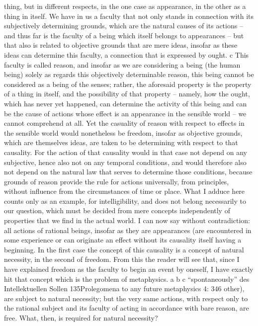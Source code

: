 thing, but in different respects, in the one case as appearance, in the
other as a thing in itself.
We have in us a faculty that not only stands in connection with its
subjectively determining grounds, which are the natural causes of its
actions – and thus far is the faculty of a being which itself belongs to
appearances – but that also is related to objective grounds that are mere
ideas, insofar as these ideas can determine this faculty, a connection that
is expressed by ought. c This faculty is called reason, and insofar as we are
considering a being (the human being) solely as regards this objectively
determinable reason, this being cannot be considered as a being of the
senses; rather, the aforesaid property is the property of a thing in itself,
and the possibility of that property – namely, how the ought, which has
never yet happened, can determine the activity of this being and can be
the cause of actions whose effect is an appearance in the sensible world –
we cannot comprehend at all. Yet the casuality of reason with respect to
effects in the sensible world would nonetheless be freedom, insofar as
objective grounds, which are themselves ideas, are taken to be determining
with respect to that causality. For the action of that causality would in
that case not depend on any subjective, hence also not on any temporal
conditions, and would therefore also not depend on the natural law that
serves to determine those conditions, because grounds of reason provide
the rule for actions universally, from principles, without inﬂuence from
the circumstances of time or place.
What I adduce here counts only as an example, for intelligibility, and
does not belong necessarily to our question, which must be decided from
mere concepts independently of properties that we ﬁnd in the actual
world.
I can now say without contradiction: all actions of rational beings,
insofar as they are appearances (are encountered in some experience or
can originate an effect without its causality itself having a beginning. In the ﬁrst
case the concept of this causality is a concept of natural necessity, in the second
of freedom. From this the reader will see that, since I have explained freedom
as the faculty to begin an event by oneself, I have exactly hit that concept which
is the problem of metaphysics.
a
b
c
“spontaneously”
des Intellektuellen
Sollen
135Prolegomena to any future metaphysics
4: 346
other), are subject to natural necessity; but the very same actions, with
respect only to the rational subject and its faculty of acting in accordance
with bare reason, are free. What, then, is required for natural necessity?
